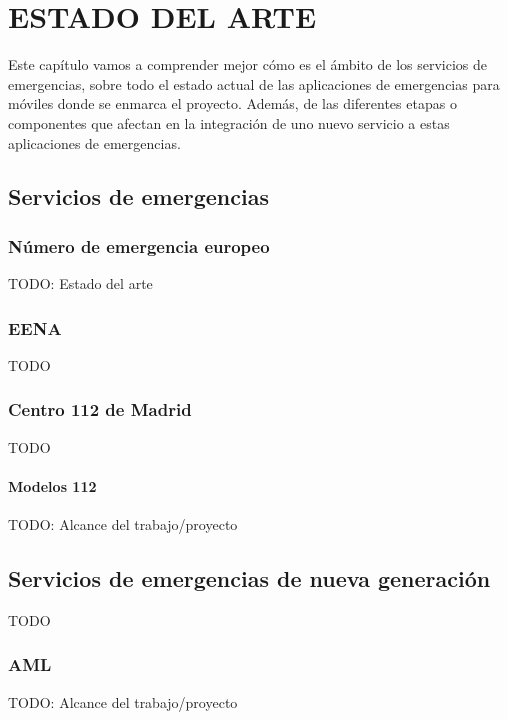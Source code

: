 \chapter{ESTADO DEL ARTE\label{sec:estado_del_arte}}

Este capítulo vamos a comprender mejor cómo es el ámbito de los servicios de emergencias, sobre todo el estado actual de las aplicaciones de emergencias para móviles donde se enmarca el proyecto. Además, de las diferentes etapas o componentes que afectan en la integración de uno nuevo servicio a estas aplicaciones de emergencias.

\section{Servicios de emergencias}

\subsection{Número de emergencia europeo}

TODO: Estado del arte

\subsection{EENA}

TODO

\subsection{Centro 112 de Madrid}

TODO

\subsubsection{Modelos 112}

TODO: Alcance del trabajo/proyecto

\section{Servicios de emergencias de nueva generación}

TODO

\subsection{AML}

TODO: Alcance del trabajo/proyecto

